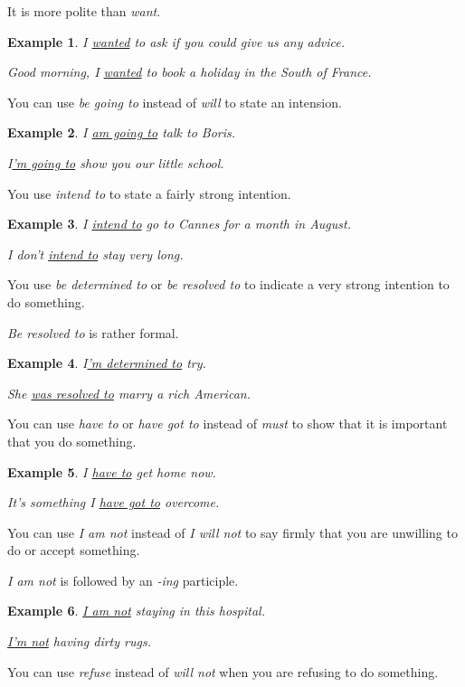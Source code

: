 \documentclass[oneside]{book}
\numberwithin{equation}{section}
\newtheorem{example}{Example}[section]
\begin{document}
It is more polite than \textit{want}.
\begin{example}
    I \underline{wanted} to ask if you could give us any advice.
    
    Good morning, I \underline{wanted} to book a holiday in the South of France.
\end{example}
%
\noindent{} You can use \textit{be going to} instead of \textit{will} to state an intension.
\begin{example}
    I \underline{am going to} talk to Boris.
    
    I\underline{'m going to} show you our little school.
\end{example}
%
\noindent{} You use \textit{intend to} to state a fairly strong intention.
\begin{example}
    I \underline{intend to} go to Cannes for a month in August.
    
    I don't \underline{intend to} stay very long.
\end{example}
%
\noindent{} You use \textit{be determined to} or \textit{be resolved to} to indicate a very strong intention to do something.

\textit{Be resolved to} is rather formal.
\begin{example}
    I\underline{'m determined to} try.
    
    She \underline{was resolved to} marry a rich American.
\end{example}
%
\noindent{} You can use \textit{have to} or \textit{have got to} instead of \textit{must} to show that it is important that you do something.
\begin{example}
    I \underline{have to} get home now.
    
    It's something I \underline{have got to} overcome.
\end{example}
%
\noindent{} You can use \textit{I am not} instead of \textit{I will not} to say firmly that you are unwilling to do or accept something.

\textit{I am not} is followed by an \textit{-ing} participle.
\begin{example}
    \underline{I am not} staying in this hospital.
    
    \underline{I'm not} having dirty rugs.
\end{example}
%
\noindent{} You can use \textit{refuse} instead of \textit{will not} when you are refusing to do something.
\end{document}
